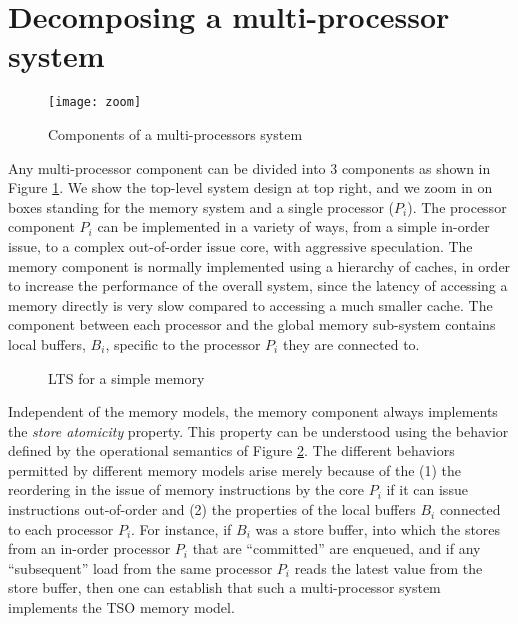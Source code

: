 \section{Decomposing a multi-processor system}
\label{sec:store-atomicity}

\begin{figure}
\centering
\texttt{[image: zoom]}
\caption{Components of a multi-processors system}
\label{zoom}
\end{figure}

Any multi-processor component can be divided into 3 components as shown in
Figure \ref{zoom}. 
We show the top-level system design at top right, and we zoom in on boxes standing for the
memory system and a single processor ($P_i$).
The processor component $P_i$ can be implemented in a
variety of ways, from a simple in-order issue, to a complex out-of-order issue
core, with aggressive speculation. The memory component is normally implemented
using a hierarchy of caches, in order to increase the performance of the
overall system, since the latency of accessing a memory directly is very slow
compared to accessing a much smaller cache. The component between each
processor and the global memory sub-system contains local buffers, $B_i$, specific to
the processor $P_i$ they are connected to. 

\begin{figure}
\centering
\begin{boxedminipage}[c]{.48\textwidth}
\inference
[Load]
{}
{}

\inference
[Store]
{}
{}

\end{boxedminipage}
\caption{LTS for a simple memory}
\label{$M_m$}
\end{figure}

Independent of the memory models, the memory component always implements the
\emph{store atomicity} property. This property can be understood using the
behavior defined by the operational semantics of Figure \ref{$M_m$}. The
different behaviors permitted by different memory models arise merely because
of the (1) the reordering in the issue of memory instructions by the core $P_i$
if it can issue instructions out-of-order and (2) the properties of the local
buffers $B_i$ connected to each processor $P_i$. For instance, if $B_i$ was a
store buffer, into which the stores from an in-order processor $P_i$ that are
``committed'' are enqueued, and if any ``subsequent'' load from the same
processor $P_i$ reads the latest value from the store buffer, then one can
establish that such a multi-processor system implements the TSO
\cite{x86tsocacm10} memory model.

